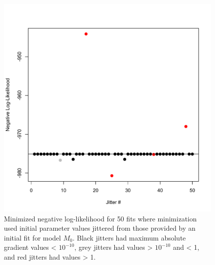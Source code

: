 \documentclass[
]{article}
\begin{document}
\begin{figure}

{\centering \includegraphics[width=1\linewidth]{fit_0_jitter_plt} 

}

\caption{Minimized negative log-likelihood for 50 fits where minimization used initial parameter values jittered from those provided by an initial fit for model $M_0$. Black jitters had maximum absolute gradient values < $10^{-10}$, grey jitters had values > $10^{-10}$ and < 1, and red jitters had values > 1.}\label{fig:jitter-M0}
\end{figure}
\pagebreak
\end{document}
